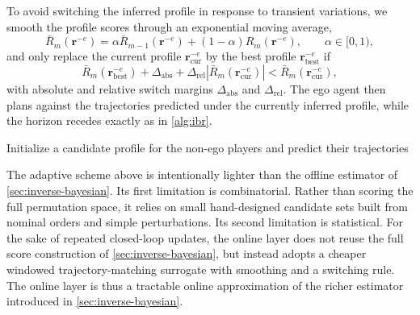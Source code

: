 To avoid switching the inferred profile in response to transient variations, we smooth the profile scores
through an exponential moving average,
\begin{equation}
\bar{R}_m(\boldsymbol{r}^{-e})
=
\alpha \bar{R}_{m-1}(\boldsymbol{r}^{-e}) + (1-\alpha) R_m(\boldsymbol{r}^{-e}),
\qquad \alpha \in [0,1),
\label{eq:inverse_online_smooth}
\end{equation}
and only replace the current profile $\boldsymbol{r}_{\mathrm{cur}}^{-e}$ by the best profile
$\boldsymbol{r}_{\mathrm{best}}^{-e}$ if
\begin{equation}
\bar{R}_m(\boldsymbol{r}_{\mathrm{best}}^{-e})
+
\Delta_{\mathrm{abs}}
+
\Delta_{\mathrm{rel}} \left| \bar{R}_m(\boldsymbol{r}_{\mathrm{cur}}^{-e}) \right|
<
\bar{R}_m(\boldsymbol{r}_{\mathrm{cur}}^{-e}),
\label{eq:inverse_online_switch}
\end{equation}
with absolute and relative switch margins $\Delta_{\mathrm{abs}}$ and $\Delta_{\mathrm{rel}}$.
The ego agent then plans against the trajectories predicted under the currently inferred profile,
while the horizon recedes exactly as in \cref{alg:ibr}.

\begin{algorithm}
\medskip
Initialize a candidate profile for the non-ego players and predict their trajectories\;
\caption{Adaptive online preference-order inference and control.}
\label{alg:inverse_online}
\end{algorithm}

The adaptive scheme above is intentionally lighter than the offline estimator of \cref{sec:inverse-bayesian}.
Its first limitation is combinatorial. Rather than scoring the full permutation space, it relies on small
hand-designed candidate sets built from nominal orders and simple perturbations.
Its second limitation is statistical. For the sake of repeated closed-loop updates, the online layer does not
reuse the full score construction of \cref{sec:inverse-bayesian}, but instead adopts a cheaper windowed
trajectory-matching surrogate with smoothing and a switching rule.
The online layer is thus a tractable online approximation of the richer estimator introduced in
\cref{sec:inverse-bayesian}.

